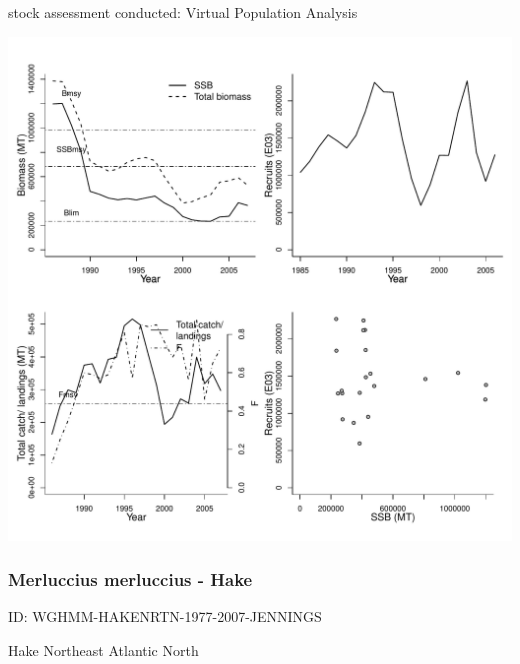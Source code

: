 stock assessment conducted: Virtual Population Analysis 
\begin{center}
\vspace{-0.2cm}\includegraphics[scale=0.65]{../tex/figures/plot-INIDEP-ARGHAKESARG-1985-2007-Parma.pdf}
\end{center}

\newpage
\subsubsection{Merluccius merluccius - Hake}
ID: WGHMM-HAKENRTN-1977-2007-JENNINGS

Hake Northeast Atlantic North 

